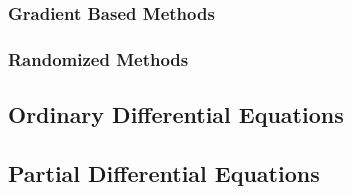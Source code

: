
\subsubsection{Gradient Based Methods}

\subsubsection{Randomized Methods}




\subsection{Ordinary Differential Equations}



\subsection{Partial Differential Equations}




%

\begin{comment}


Numerische Methoden - Angewandte Mathematik für Ingenieure
https://www.youtube.com/playlist?list=PLcQq8Z8G1veYx72P3svwG5K72WINt_tvZ


Translating formulas to code:
-A matrix equation like x = A^{-1} b means: solve A x = b. We don't want to actually compute the
 inverse of A because that's much more expensive that solveing the linear system of equation by
 e.g. Gaussian elimination.
-An equation like p = atan(y/x) usually means p = atan2(y,x) ...at least in 99.9%
 Beware of the argument order. atan2 usually takes the y coordinate first and the x coordinate 
 second - but  there may be exceptions. atan2(y,x) computes the angle of the point (x,y) with the x-axis. This  angle is used in the polar coordinate representation (r,p) of the point where r is 
 the radius and p the angle also known as "phase" or "argument".
 
 
https://en.wikipedia.org/wiki/Rounding#Table-maker's_dilemma 
 

\end{comment}